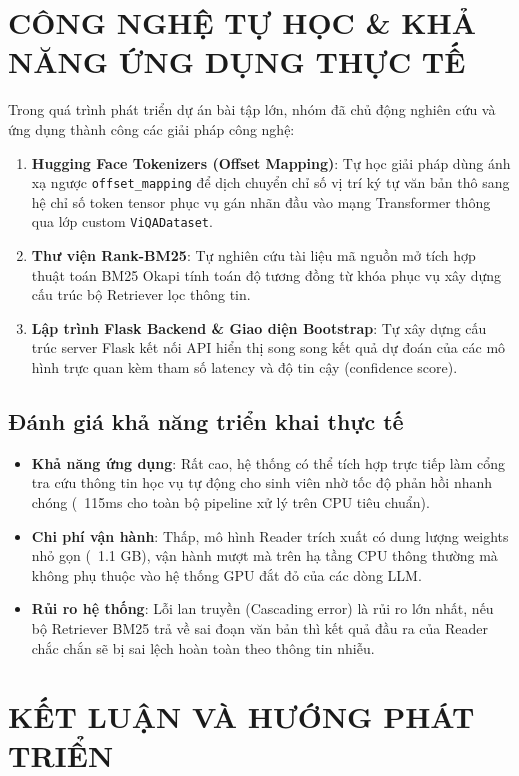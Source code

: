 \documentclass[12pt, a4paper]{article}
\begin{document}
\section{CÔNG NGHỆ TỰ HỌC \& KHẢ NĂNG ỨNG DỤNG THỰC TẾ}
Trong quá trình phát triển dự án bài tập lớn, nhóm đã chủ động nghiên cứu và ứng dụng thành công các giải pháp công nghệ:
\begin{enumerate}
    \item \textbf{Hugging Face Tokenizers (Offset Mapping)}: Tự học giải pháp dùng ánh xạ ngược \texttt{offset\_mapping} để dịch chuyển chỉ số vị trí ký tự văn bản thô sang hệ chỉ số token tensor phục vụ gán nhãn đầu vào mạng Transformer thông qua lớp custom \texttt{ViQADataset}.
    \item \textbf{Thư viện Rank-BM25}: Tự nghiên cứu tài liệu mã nguồn mở tích hợp thuật toán BM25 Okapi tính toán độ tương đồng từ khóa phục vụ xây dựng cấu trúc bộ Retriever lọc thông tin.
    \item \textbf{Lập trình Flask Backend \& Giao diện Bootstrap}: Tự xây dựng cấu trúc server Flask kết nối API hiển thị song song kết quả dự đoán của các mô hình trực quan kèm tham số latency và độ tin cậy (confidence score).
\end{enumerate}

\subsection{Đánh giá khả năng triển khai thực tế}
\begin{itemize}
    \item \textbf{Khả năng ứng dụng}: Rất cao, hệ thống có thể tích hợp trực tiếp làm cổng tra cứu thông tin học vụ tự động cho sinh viên nhờ tốc độ phản hồi nhanh chóng (~115ms cho toàn bộ pipeline xử lý trên CPU tiêu chuẩn).
    \item \textbf{Chi phí vận hành}: Thấp, mô hình Reader trích xuất có dung lượng weights nhỏ gọn (~1.1 GB), vận hành mượt mà trên hạ tầng CPU thông thường mà không phụ thuộc vào hệ thống GPU đắt đỏ của các dòng LLM.
    \item \textbf{Rủi ro hệ thống}: Lỗi lan truyền (Cascading error) là rủi ro lớn nhất, nếu bộ Retriever BM25 trả về sai đoạn văn bản thì kết quả đầu ra của Reader chắc chắn sẽ bị sai lệch hoàn toàn theo thông tin nhiễu.
\end{itemize}

\section{KẾT LUẬN VÀ HƯỚNG PHÁT TRIỂN}
\end{document}
